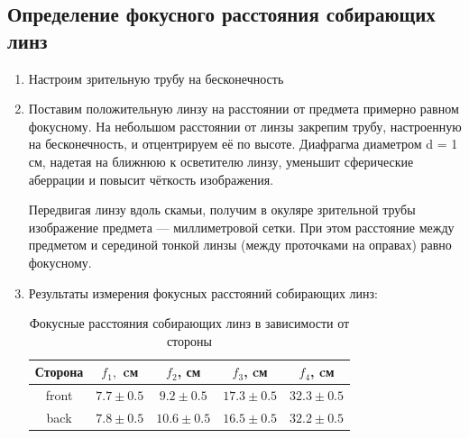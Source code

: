 \documentclass[a4paper,12pt]{article} %
\begin{document}
\subsection*{Определение фокусного расстояния собирающих линз}

\begin{enumerate}
    \item Настроим зрительную трубу на бесконечность
    \item Поставим положительную линзу на
расстоянии от предмета примерно равном фокусному. На небольшом расстоянии от линзы закрепим трубу, настроенную на бесконечность,
и отцентрируем её по высоте. Диафрагма диаметром
d = 1 см, надетая на ближнюю к осветителю линзу, уменьшит сферические аберрации и повысит чёткость изображения. \par
Передвигая линзу вдоль скамьи, получим в окуляре зрительной трубы изображение предмета
— миллиметровой сетки. При этом расстояние между предметом и серединой тонкой линзы (между проточками на оправах) равно фокусному.
    \item Результаты измерения фокусных расстояний собирающих линз:
\begin{table}[H]
	\caption{Фокусные расстояния собирающих линз в зависимости от стороны}
	\label{table1}	
	\begin{center}
		\begin{tabular}{|c|c|c|c|c|}
			\hline
			Сторона   & $ f_1,$ cм & $ f_2 $, см & $f_3 $, cм & $ f_4 $, cм\\
			\hline
			front &	 $7.7\pm0.5$	&	$9.2\pm0.5$   & $17.3\pm0.5$  & $32.3\pm0.5$ \\
			\hline
			back  &	$7.8\pm0.5$	&	$10.6\pm0.5$  & $16.5\pm0.5$  & $32.2\pm0.5$ \\
			\hline
		\end{tabular}
	\end{center}

\end{table}
\end{enumerate}
\end{document}
